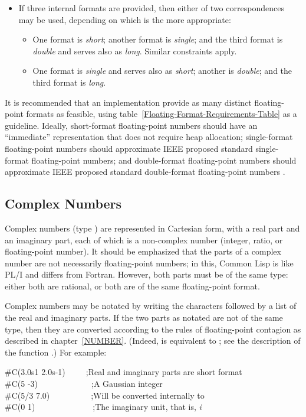 \begin{itemize}
\item
If three internal formats are provided, then either of two correspondences
may be used, depending on which is the more appropriate:
\begin{itemize}
\item
One format is {\it short}; another format is {\it single}; and the third format is
{\it double} and serves also as {\it long}.  Similar constraints apply.

\item
One format is {\it single} and serves also as {\it short};
another is {\it double}; and the third format is {\it long}.
\end{itemize}
\end{itemize}

\beforenoterule
\begin{implementation}
It is recommended that an implementation
provide as many distinct floating-point formats as feasible,
using table~\ref{Floating-Format-Requirements-Table} as a guideline.
Ideally, short-format floating-point numbers should have an
``immediate'' representation that does not require heap allocation;
single-format
floating-point numbers should approximate IEEE proposed standard
single-format floating-point numbers; and double-format floating-point
numbers should approximate IEEE proposed standard double-format
floating-point numbers
\cite{IEEE-PROPOSED-FLOATING-POINT-STANDARD,IEEE-FLOATING-POINT-IMPL-GUIDE,IEEE-FLOATING-POINT-IMPL-GUIDE-ERRATA}.
\end{implementation}
\afternoterule


\subsection{Complex Numbers}

Complex numbers (type )
are represented in Cartesian form, with a real part and an imaginary
part, each of which is a non-complex number (integer, ratio, or floating-point
number).  It should be emphasized that the parts of a complex
number are not necessarily floating-point numbers; in this, Common Lisp
is like PL/I and differs from Fortran.  However, both parts must
be of the same type: either both are rational, or both are of the
same floating-point format.

Complex numbers may be notated by writing the characters 
followed by a list of the real and imaginary parts.
If the two parts as notated are not of the same type, then
they are converted according to the rules of floating-point contagion
as described in chapter~\ref{NUMBER}.
(Indeed,  is equivalent to ;
see the description of the function .)
For example:
\begin{lisp}
\#C(3.0s1 2.0s-1)~~~~~;{\rm Real and imaginary parts are short format}\\
\#C(5 -3)~~~~~~~~~~~~~;{\rm A Gaussian integer} \\
\#C(5/3 7.0)~~~~~~~~~~;{\rm Will be converted internally to } \\
\#C(0 1)~~~~~~~~~~~~~~;{\rm The imaginary unit, that is, {\it i}}
\end{lisp}

